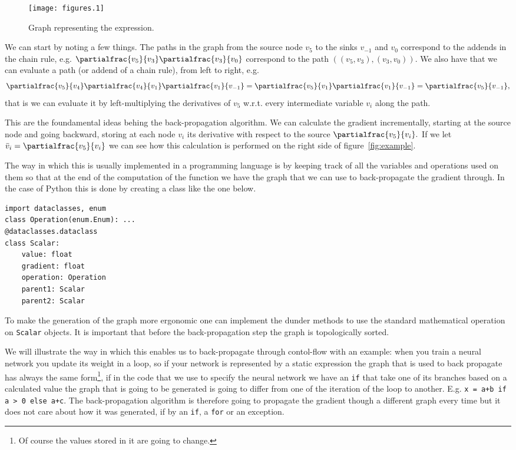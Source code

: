 \documentclass{article}
\begin{document}
\begin{figure}
\centering
\texttt{[image: figures.1]}
\label{fig:dag}
\caption{Graph representing the expression.}
\end{figure}

We can start by noting a few things. The paths in the graph from the source
node \(v_5\)
to the sinks \(v_{-1}\) and \(v_0\) correspond to the addends in the chain
rule, e.g.
\(\partialfrac{v_5}{v_3}\partialfrac{v_3}{v_0}\) correspond to the path
\(((v_5,v_3), (v_3,v_0)).\) We also have that we can evaluate a path (or addend
of a chain rule), from left to right, e.g. \[
\partialfrac{v_5}{v_4}\partialfrac{v_4}{v_1}\partialfrac{v_1}{v_{-1}}
= \partialfrac{v_5}{v_1}\partialfrac{v_1}{v_{-1}}
= \partialfrac{v_5}{v_{-1}},\]
that is we can evaluate it by left-multiplying the derivatives of \(v_5\)
w.r.t. every intermediate variable \(v_i\) along the path.

This are the foundamental ideas behing the back-propagation algorithm. We
can calculate the gradient incrementally, starting at the source node and going
backward, storing at each node \(v_i\) its derivative with respect to the
source \(\partialfrac{v_5}{v_i}.\)
If we let \(\bar v_i = \partialfrac{v_5}{v_i}\) we can see how this calculation
is performed on the right side of figure~\ref{fig:example}.

The way in which this is usually implemented in a programming language is by
keeping track of all the variables and operations used on them so that at the
end of the computation of the function we have the graph that we can use to
back-propagate the gradient through. In the case of Python this is done by
creating a class like the one below.

\begin{verbatim}
import dataclasses, enum
class Operation(enum.Enum): ...
@dataclasses.dataclass
class Scalar:
    value: float
    gradient: float
    operation: Operation
    parent1: Scalar
    parent2: Scalar
\end{verbatim}

To make the generation of the graph more ergonomic one can implement the dunder
methods to use the standard mathematical operation on \texttt{Scalar} objects.
It is important that before the back-propagation step the graph is
topologically sorted.

We will illustrate the way in which this
enables us to back-propagate through contol-flow with an example: when you train
a neural network you update its weight in a loop, so if your network is
represented by a static expression the graph that is used to back propagate has
always the same form\footnote{Of course the values stored in it are going to
change.}, if in the code that we use to specify the neural network we have an
\texttt{if} that take one of its branches based on a calculated value the graph
that is going to be generated is going to differ from one of the iteration of
the loop to another. E.g. \texttt{x = a+b if a > 0 else a+c}.
The back-propagation algorithm is therefore going to
propagate the gradient though a different graph every time but it does not care
about how it was generated, if by an \texttt{if}, a \texttt{for} or an
exception.
\end{document}
